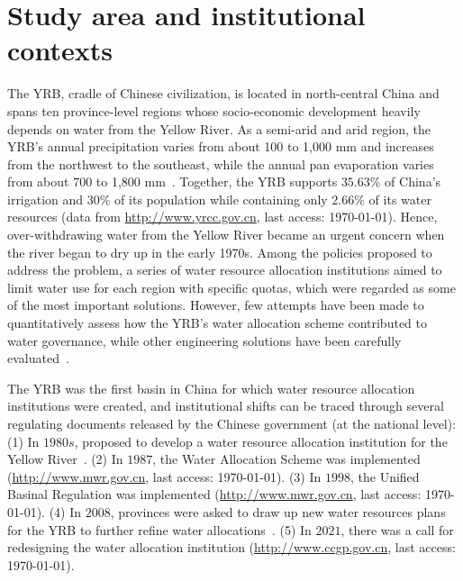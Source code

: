 \documentclass[preprint, 12pt]{elsarticle}
\providecommand{\DIFaddtex}[1]{{\protect\color{blue}\uwave{#1}}} %
\providecommand{\DIFaddbegin}{} %
\providecommand{\DIFaddend}{} %
\providecommand{\DIFadd}[1]{\texorpdfstring{\DIFaddtex{#1}}{#1}} %
\begin{document}
\section{Study area and institutional contexts}\label{sec:yrb}

The YRB, cradle of Chinese civilization, is located in north-central China and spans ten province-level regions whose socio-economic development heavily depends on water from the Yellow River.
As a semi-arid and arid region, the YRB's annual precipitation varies from about 100 to 1,000 mm and increases from the northwest to the southeast, while the annual pan evaporation varies from about 700 to 1,800 mm~\cite{wang2022e}.
Together, the YRB supports $35.63\%$ of China's irrigation and $30\%$ of its population while containing only $2.66\%$ of its water resources (data from \href{http://www.yrcc.gov.cn}{http://www.yrcc.gov.cn}, last access: \today).
Hence, over-withdrawing water from the Yellow River became an urgent concern when the river began to dry up in the early 1970s.
Among the policies proposed to address the problem, a series of water resource allocation institutions aimed to limit water use for each region with specific quotas, which were regarded as some of the most important solutions.
However, few attempts have been made to quantitatively assess how the YRB's water allocation scheme contributed to water governance, while other engineering solutions have been carefully evaluated~\cite{long2020}.

\DIFaddbegin

\DIFaddend The YRB was the first basin in China for which water resource allocation institutions were created, and institutional shifts can be traced through several regulating documents released by the Chinese government (at the national level):
(1) In $1980s$, \DIFaddbegin \DIFadd{the central government }\DIFaddend proposed to develop a water resource allocation institution for the Yellow River~\cite{wang2019d, wang2019e}.
(2) In $1987$, the Water Allocation Scheme was implemented (\href{http://www.gov.cn/zhengce/content/2011-03/30/content_3138.htm#}{http://www.mwr.gov.cn}, last access: \today).
(3) In $1998$, the Unified Basinal Regulation was implemented (\href{http://www.mwr.gov.cn/ztpd/2013ztbd/2013fxkh/fxkhswcbcs/cs/flfg/201304/t20130411_433489.html}{http://www.mwr.gov.cn}, last access: \today).
(4) In $2008$, provinces were asked to draw up new water resources plans for the YRB to further refine water allocations~\cite{wang2019d,wang2019e}.
(5) In $2021$, there was a call for redesigning the water allocation institution (\href{http://www.ccgp.gov.cn/cggg/zygg/gkzb/202107/t20210721_16591901.htm}{http://www.ccgp.gov.cn}, last access: \today).
\end{document}
